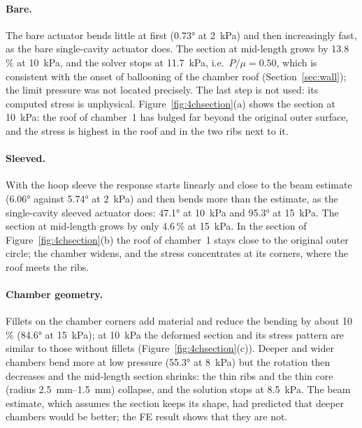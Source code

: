 \documentclass[12pt,a4paper,oneside]{report}
\numberwithin{equation}{chapter}
\numberwithin{figure}{chapter}
\numberwithin{table}{chapter}
\begin{document}
\paragraph{Bare.} The bare actuator bends little at first (\ang{0.73} at \SI{2}{kPa}) and then increasingly
fast, as the bare single-cavity actuator does. The section at mid-length grows by 13.8\,\% at \SI{10}{kPa},
and the solver stops at \SI{11.7}{kPa}, i.e.\ $P/\mu=0.50$, which is consistent with the onset of ballooning
of the chamber roof (Section~\ref{sec:wall}); the limit pressure was not located precisely. The last step is
not used: its computed stress is unphysical. Figure~\ref{fig:4chsection}(a) shows the section at
\SI{10}{kPa}: the roof of chamber~1 has bulged far beyond the original outer surface, and the stress is
highest in the roof and in the two ribs next to it.

\paragraph{Sleeved.} With the hoop sleeve the response starts linearly and close to the beam estimate
(\ang{6.06} against \ang{5.74} at \SI{2}{kPa}) and then bends more than the estimate, as the single-cavity
sleeved actuator does: \ang{47.1} at \SI{10}{kPa} and \ang{95.3} at \SI{15}{kPa}. The section at mid-length grows
by only 4.6\,\% at \SI{15}{kPa}. In the section of Figure~\ref{fig:4chsection}(b) the roof of chamber~1 stays
close to the original outer circle; the chamber widens, and the stress concentrates at its corners, where the
roof meets the ribs.

\paragraph{Chamber geometry.} Fillets on the chamber corners add material and reduce the bending by about
10\,\% (\ang{84.6} at \SI{15}{kPa}); at \SI{10}{kPa} the deformed section and its stress pattern are similar to those without
fillets (Figure~\ref{fig:4chsection}(c)). Deeper and wider chambers bend more at low pressure (\ang{55.3} at
\SI{8}{kPa}) but the rotation then decreases and the mid-length section shrinks: the thin ribs and the thin
core (radius \SIrange{2.5}{1.5}{mm}) collapse, and the solution stops at \SI{8.5}{kPa}. The beam estimate,
which assumes the section keeps its shape, had predicted that deeper chambers would be better; the FE result
shows that they are not.
\end{document}
